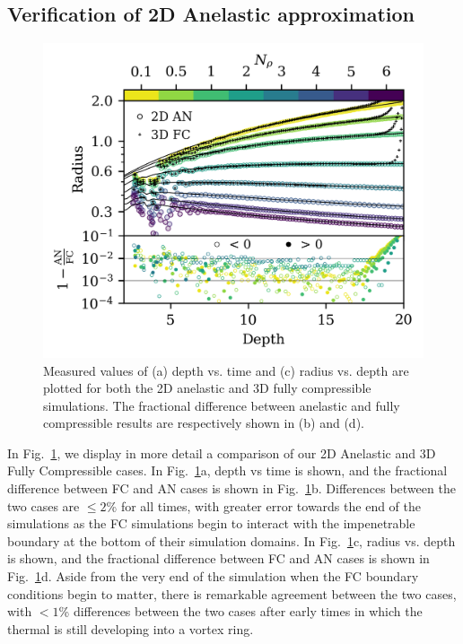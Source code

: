 \documentclass[twocolumn, amsmath, amsfonts, amssymb, trackchanges]{aastex62}
\begin{document}
\subsection{Verification of 2D Anelastic approximation}
\begin{figure}[t!]
    \includegraphics[width=\textwidth]{diff_AN_FC.png}
    \caption{Measured values of (a) depth vs. time and (c) radius vs. depth are plotted
	for both the 2D anelastic and 3D fully compressible simulations. The fractional
	difference between anelastic and fully compressible results are respectively shown
	in (b) and (d).
    \label{fig:diff} }
\end{figure}

In Fig.~\ref{fig:diff}, we display in more detail a comparison of our 2D Anelastic and
3D Fully Compressible cases. In Fig.~\ref{fig:diff}a, depth vs time is shown, and the
fractional difference between FC and AN cases is shown in Fig.~\ref{fig:diff}b.
Differences between the two cases are $\leq 2$\% for all times, with greater error towards
the end of the simulations as the FC simulations begin to interact with the impenetrable
boundary at the bottom of their simulation domains.  In Fig.~\ref{fig:diff}c, radius
vs. depth is shown, and the fractional difference between FC and AN cases is shown in
Fig.~\ref{fig:diff}d. Aside from the very end of the simulation when the FC boundary conditions
begin to matter, there is remarkable agreement between the two cases, with $< 1$\% differences
between the two cases after early times in which the thermal is still developing into a vortex
ring.
\end{document}
